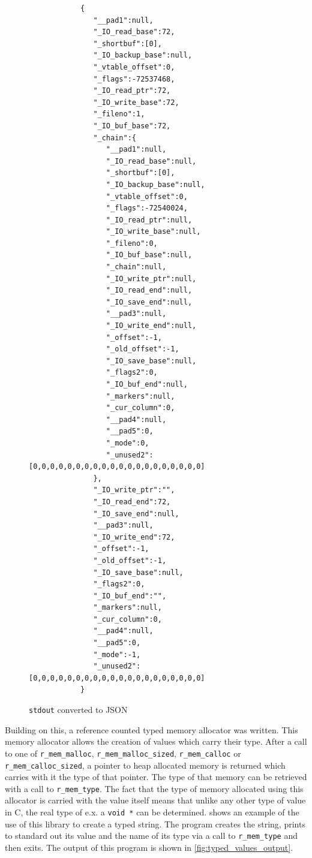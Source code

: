 \documentclass{report}
\begin{document}
\begin{figure}
	{
		\footnotesize
		\begin{verbatim}
			{
			   "__pad1":null,
			   "_IO_read_base":72,
			   "_shortbuf":[0],
			   "_IO_backup_base":null,
			   "_vtable_offset":0,
			   "_flags":-72537468,
			   "_IO_read_ptr":72,
			   "_IO_write_base":72,
			   "_fileno":1,
			   "_IO_buf_base":72,
			   "_chain":{
			      "__pad1":null,
			      "_IO_read_base":null,
			      "_shortbuf":[0],
			      "_IO_backup_base":null,
			      "_vtable_offset":0,
			      "_flags":-72540024,
			      "_IO_read_ptr":null,
			      "_IO_write_base":null,
			      "_fileno":0,
			      "_IO_buf_base":null,
			      "_chain":null,
			      "_IO_write_ptr":null,
			      "_IO_read_end":null,
			      "_IO_save_end":null,
			      "__pad3":null,
			      "_IO_write_end":null,
			      "_offset":-1,
			      "_old_offset":-1,
			      "_IO_save_base":null,
			      "_flags2":0,
			      "_IO_buf_end":null,
			      "_markers":null,
			      "_cur_column":0,
			      "__pad4":null,
			      "__pad5":0,
			      "_mode":0,
			      "_unused2":[0,0,0,0,0,0,0,0,0,0,0,0,0,0,0,0,0,0,0,0]
			   },
			   "_IO_write_ptr":"",
			   "_IO_read_end":72,
			   "_IO_save_end":null,
			   "__pad3":null,
			   "_IO_write_end":72,
			   "_offset":-1,
			   "_old_offset":-1,
			   "_IO_save_base":null,
			   "_flags2":0,
			   "_IO_buf_end":"",
			   "_markers":null,
			   "_cur_column":0,
			   "__pad4":null,
			   "__pad5":0,
			   "_mode":-1,
			   "_unused2":[0,0,0,0,0,0,0,0,0,0,0,0,0,0,0,0,0,0,0,0]
			}
		\end{verbatim}
	}
	\caption{\lstinline|stdout| converted to JSON}
	\label{fig:stdout_json}
\end{figure}

Building on this, a reference counted typed memory allocator was written. This
memory allocator allows the creation of values which carry their type. After a
call to one of \lstinline|r_mem_malloc|, \lstinline|r_mem_malloc_sized|,
\lstinline|r_mem_calloc| or \lstinline|r_mem_calloc_sized|, a pointer to heap
allocated memory is returned which carries with it the type of that pointer.
The type of that memory can be retrieved with a call to \lstinline|r_mem_type|.
The fact that the type of memory allocated using this allocator is carried with
the value itself means that unlike any other type of value in C, the real type
of e.x. a \lstinline|void *| can be determined.  
shows an example of the use of this library to create a typed string. The
program creates the string, prints to standard out its value and the name of its
type via a call to \lstinline|r_mem_type| and then exits. The output of this
program is shown in \cref{fig:typed_values_output}.
\end{document}
